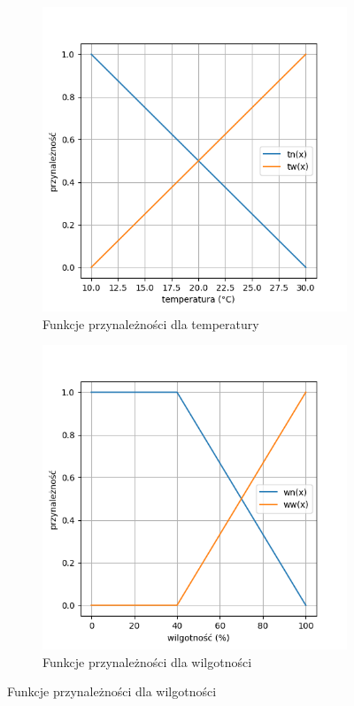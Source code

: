 \documentclass{article}
\begin{document}
\begin{figure}[H]
    \centering
    \begin{subfigure}{0.45\textwidth}
        \centering
        \includegraphics[width=\linewidth]{Zad1/tn_tw.png}
        \caption{Funkcje przynależności dla temperatury}
    \end{subfigure}
    \hfill
    \begin{subfigure}{0.45\textwidth}
        \centering
        \includegraphics[width=\linewidth]{Zad1/wn_ww.png}
        \caption{Funkcje przynależności dla wilgotności}
    \end{subfigure}
    

\end{figure}
\end{document}
